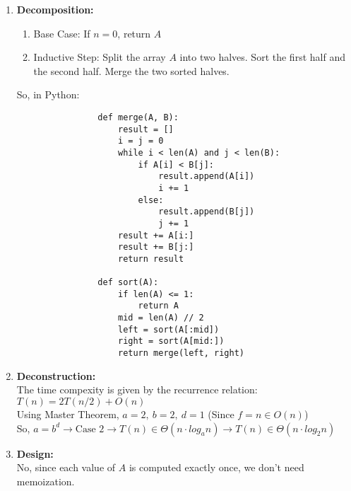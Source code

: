 \documentclass[a4paper]{article}
\begin{document}
\begin{enumerate}
\begin{enumerate}
            \item \textbf{Decomposition:} \\
            \begin{enumerate}
                \item Base Case: If $n = 0$, return $A$ \\
                \item Inductive Step: Split the array $A$ into two halves. Sort the first half and the second half. Merge the two sorted halves. \\
            \end{enumerate}

            So, in Python:
            \lstset{language=Python}
            \begin{lstlisting}
                def merge(A, B):
                    result = []
                    i = j = 0
                    while i < len(A) and j < len(B):
                        if A[i] < B[j]:
                            result.append(A[i])
                            i += 1
                        else:
                            result.append(B[j])
                            j += 1
                    result += A[i:]
                    result += B[j:]
                    return result

                def sort(A):
                    if len(A) <= 1:
                        return A
                    mid = len(A) // 2
                    left = sort(A[:mid])
                    right = sort(A[mid:])
                    return merge(left, right)
            \end{lstlisting}

            \item \textbf{Deconstruction:} \\
            The time compexity is given by the recurrence relation: $T(n) = 2T(n/2) + O(n)$ \\
            Using Master Theorem, $a = 2,\ b = 2,\ d = 1$ (Since $f = n \in O(n)$) \\
            So, $a = b^d \rightarrow \text{Case 2} \rightarrow T(n) \in \Theta(n \cdot log_{a}n) \rightarrow T(n) \in \Theta(n \cdot log_{2}n)$ \\

            \item \textbf{Design:} \\
            No, since each value of $A$ is computed exactly once, we don't need memoization. \\


\end{enumerate}
\end{enumerate}
\end{document}

